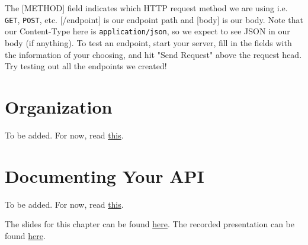 The [METHOD] field indicates which HTTP request method we are using i.e. \texttt{GET}, \texttt{POST}, etc. [/endpoint] is our endpoint path and [body] is our body. Note that our Content-Type here is \texttt{application/json}, so we expect to see JSON in our body (if anything). To test an endpoint, start your server, fill in the fields with the information of your choosing, and hit "Send Request" above the request head. Try testing out all the endpoints we created!

\section{Organization}
To be added. For now, read \href{https://blog.logrocket.com/organizing-express-js-project-structure-better-productivity}{this}.
\section{Documenting Your API}
To be added. For now, read \href{https://swagger.io/solutions/api-documentation/}{this}.

\begin{kaobox}[title=Slides and Recording]
    The slides for this chapter can be found \href{https://docs.google.com/presentation/d/10hb3tY3MGbPm0vairW4fOs33INpPb92QIaHFhs0zens/edit?usp=share_link}{here}. The recorded presentation can be found \href{https://youtu.be/0KXd9ySglwU}{here}.
\end{kaobox}

